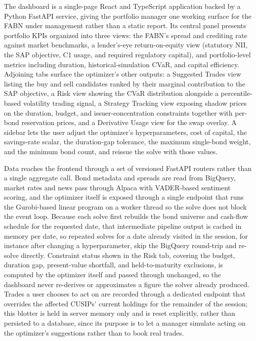 \documentclass[12pt]{article}
\begin{document}
The dashboard is a single-page React and TypeScript application backed by a Python FastAPI service, giving the portfolio manager one working surface for the FABN under management rather than a static report. Its central panel presents portfolio KPIs organized into three views: the FABN's spread and crediting rate against market benchmarks, a lender's-eye return-on-equity view (statutory NII, the SAP objective, C1 usage, and required regulatory capital), and portfolio-level metrics including duration, historical-simulation CVaR, and capital efficiency. Adjoining tabs surface the optimizer's other outputs: a Suggested Trades view listing the buy and sell candidates ranked by their marginal contribution to the SAP objective, a Risk view showing the CVaR distribution alongside a percentile-based volatility trading signal, a Strategy Tracking view exposing shadow prices on the duration, budget, and issuer-concentration constraints together with per-bond reservation prices, and a Derivative Usage view for the swap overlay. A sidebar lets the user adjust the optimizer's hyperparameters, cost of capital, the savings-rate scalar, the duration-gap tolerance, the maximum single-bond weight, and the minimum bond count, and reissue the solve with those values.

Data reaches the frontend through a set of versioned FastAPI routers rather than a single aggregate call. Bond metadata and spreads are read from BigQuery, market rates and news pass through Alpaca with VADER-based sentiment scoring, and the optimizer itself is exposed through a single endpoint that runs the Gurobi-based linear program on a worker thread so the solve does not block the event loop. Because each solve first rebuilds the bond universe and cash-flow schedule for the requested date, that intermediate pipeline output is cached in memory per date, so repeated solves for a date already visited in the session, for instance after changing a hyperparameter, skip the BigQuery round-trip and re-solve directly. Constraint status shown in the Risk tab, covering the budget, duration gap, present-value shortfall, and held-to-maturity exclusions, is computed by the optimizer itself and passed through unchanged, so the dashboard never re-derives or approximates a figure the solver already produced. Trades a user chooses to act on are recorded through a dedicated endpoint that overrides the affected CUSIPs' current holdings for the remainder of the session; this blotter is held in server memory only and is reset explicitly, rather than persisted to a database, since its purpose is to let a manager simulate acting on the optimizer's suggestions rather than to book real trades.
\end{document}
